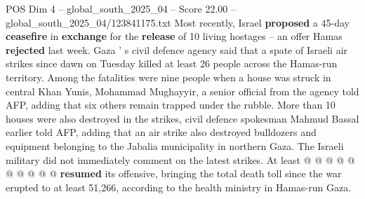 \begin{textsample}{POS Dim 4 – global\_south\_2025\_04 – Score 22.00 – global\_south\_2025\_04/123841175.txt}
Most recently, Israel \textbf{proposed} a 45-day \textbf{ceasefire} in \textbf{exchange} for the \textbf{release} of 10 living hostages -- an offer Hamas \textbf{rejected} last week.
Gaza ' s civil defence agency said that a spate of Israeli air strikes since dawn on Tuesday killed at least 26 people across the Hamas-run territory.
Among the fatalities were nine people when a house was struck in central Khan Yunis, Mohammad Mughayyir, a senior official from the agency told AFP, adding that six others remain trapped under the rubble.
More than 10 houses were also destroyed in the strikes, civil defence spokesman Mahmud Bassal earlier told AFP, adding that an air strike also destroyed bulldozers and equipment belonging to the Jabalia municipality in northern Gaza.
The Israeli military did not immediately comment on the latest strikes.
At least @ @ @ @ @ @ @ @ @ @ \textbf{resumed} its offensive, bringing the total death toll since the war erupted to at least 51,266, according to the health ministry in Hamas-run Gaza.

\end{textsample}
